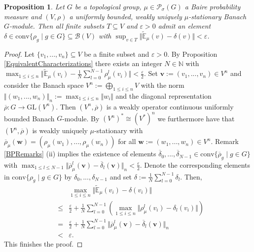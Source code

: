 \documentclass[a4paper,11pt,reqno]{amsart}
\numberwithin{equation}{section}
\newtheorem{proposition}[theorem]{Proposition}
\theoremstyle{definition}
\theoremstyle{remark}
\theoremstyle{remark}
\begin{document}
\begin{proposition} \label{ConvexHull} Let $G$ be a topological group, $\mu\in\mathcal{P}_{\sigma}(G)$ a Baire probability measure and $(V,\rho)$ a uniformly bounded, weakly uniquely $\mu$-stationary Banach $G$-module. Then all finite subsets $T\subseteq V$ and $\varepsilon>0$ admit an element \emph{$\delta\in\text{conv}\{\rho_{g}\mid g\in G\}\subseteq\mathcal{B}(V)$} with $\sup_{v\in T}\Vert\widetilde{\mathbb{E}}_{\mu}(v)-\delta(v)\Vert<\varepsilon$. \end{proposition}

\begin{proof} Let $\{v_{1},...,v_{n}\}\subseteq V$ be a finite subset and $\varepsilon>0$. By Proposition \ref{EquivalentCharacterizations} there exists an integer $N\in\mathbb{N}$ with $\max_{1\leq i\leq n}\Vert\widetilde{\mathbb{E}}_{\mu}(v_{i})-\frac{1}{N}\sum_{l=0}^{N-1}\rho_{\mu}^{l}(v_{i})\Vert<\frac{\varepsilon}{2}$. Set $\mathbf{v}:=(v_{1},...,v_{n})\in V^{n}$ and consider the Banach space $V^{n}:=\bigoplus_{1\leq i\leq n}V$ with the norm $\Vert(w_{1},...,w_{n})\Vert_{n}:=\max_{1\leq i\leq n}\Vert w_{i}\Vert$ and the diagonal representation $\overline{\rho}:G\rightarrow\text{GL}(V^{n})$. Then $(V^{n},\overline{\rho})$ is a weakly operator continuous uniformly bounded Banach $G$-module. By $(V^{n})^{\ast}\cong(V^{\ast})^{n}$ we furthermore have that $(V^{n},\overline{\rho})$ is weakly uniquely $\mu$-stationary with $\overline{\rho}_{\mu}(\mathbf{w})=(\rho_{\mu}(w_{1}),...,\rho_{\mu}(w_{n}))$ for all $\mathbf{w}:=(w_{1},...,w_{n})\in V^{n}$. Remark \ref{BPRemarks} (ii) implies the existence of elements $\overline{\delta}_{0},...,\overline{\delta}_{N-1}\in\text{conv}\{\overline{\rho}_{g}\mid g\in G\}$ with $\max_{1\leq l\leq N-1}\Vert\overline{\rho}_{\mu}^{l}(\mathbf{v})-\overline{\delta}_{l}(\mathbf{v})\Vert_{n}<\frac{\varepsilon}{2}$. Denote the corresponding elements in $\text{conv}\{\rho_{g}\mid g\in G\}$ by $\delta_{0},...,\delta_{N-1}$ and set $\delta:=\frac{1}{N}\sum_{l=0}^{N-1}\delta_{l}$. Then, 
\begin{eqnarray*}
 &  & \max_{1\leq i\leq n}\Vert\widetilde{\mathbb{E}}_{\mu}(v_{i})-\delta(v_{i})\Vert\\
 & \leq & \frac{\varepsilon}{2}+\frac{1}{N}\sum_{l=0}^{N-1}\left(\max_{1\leq i\leq n}\Vert\rho_{\mu}^{l}(v_{i})-\delta_{l}(v_{i})\Vert\right)\\
 & = & \frac{\varepsilon}{2}+\frac{1}{N}\sum_{l=0}^{N-1}\Vert\overline{\rho}_{\mu}^{l}(\mathbf{v})-\overline{\delta}_{l}(\mathbf{v})\Vert_{n}\\
 & < & \varepsilon.
\end{eqnarray*}
This finishes the proof. \end{proof}
\end{document}
